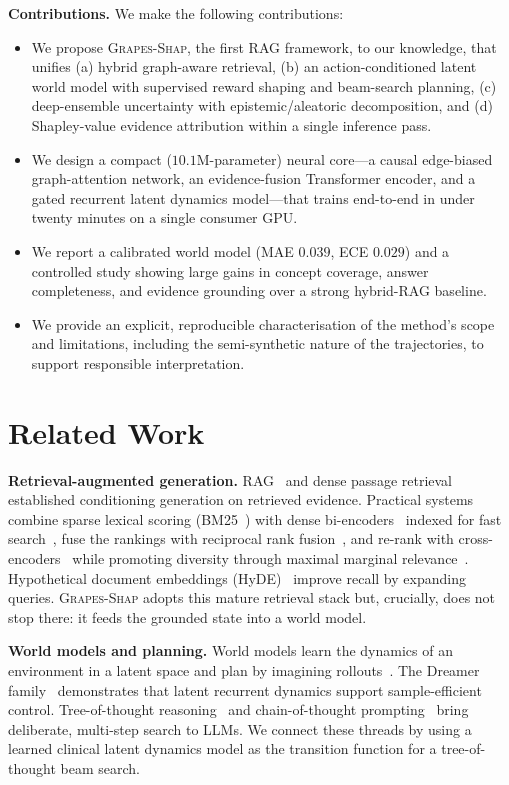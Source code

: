 \documentclass[conference]{IEEEtran}
\newcommand{\method}{\textsc{Grapes-Shap}}
\begin{document}
\noindent\textbf{Contributions.} We make the following contributions:
\begin{itemize}
\item We propose \method, the first RAG framework, to our knowledge, that
unifies (a) hybrid graph-aware retrieval, (b) an action-conditioned latent
world model with supervised reward shaping and beam-search planning, (c)
deep-ensemble uncertainty with epistemic/aleatoric decomposition, and (d)
Shapley-value evidence attribution within a single inference pass.
\item We design a compact ($10.1$M-parameter) neural core---a causal
edge-biased graph-attention network, an evidence-fusion Transformer encoder,
and a gated recurrent latent dynamics model---that trains end-to-end in under
twenty minutes on a single consumer GPU.
\item We report a calibrated world model (MAE $0.039$, ECE $0.029$) and a
controlled study showing large gains in concept coverage, answer completeness,
and evidence grounding over a strong hybrid-RAG baseline.
\item We provide an explicit, reproducible characterisation of the method's
scope and limitations, including the semi-synthetic nature of the
trajectories, to support responsible interpretation.
\end{itemize}

\section{Related Work}
\textbf{Retrieval-augmented generation.}
RAG~\cite{lewis2020rag} and dense passage retrieval~\cite{karpukhin2020dpr}
established conditioning generation on retrieved evidence. Practical systems
combine sparse lexical scoring (BM25~\cite{robertson2009bm25}) with dense
bi-encoders~\cite{reimers2019sbert} indexed for fast search~\cite{johnson2019faiss},
fuse the rankings with reciprocal rank fusion~\cite{cormack2009rrf}, and
re-rank with cross-encoders~\cite{nogueira2019passage} while promoting
diversity through maximal marginal relevance~\cite{carbonell1998mmr}.
Hypothetical document embeddings (HyDE)~\cite{gao2023hyde} improve recall by
expanding queries. \method{} adopts this mature retrieval stack but, crucially,
does not stop there: it feeds the grounded state into a world model.

\textbf{World models and planning.}
World models learn the dynamics of an environment in a latent space and plan
by imagining rollouts~\cite{ha2018worldmodels}. The Dreamer
family~\cite{hafner2020dreamer,hafner2023dreamerv3} demonstrates that latent
recurrent dynamics support sample-efficient control. Tree-of-thought
reasoning~\cite{yao2023tot} and chain-of-thought
prompting~\cite{wei2022cot} bring deliberate, multi-step search to LLMs. We
connect these threads by using a learned clinical latent dynamics model as the
transition function for a tree-of-thought beam search.
\end{document}
